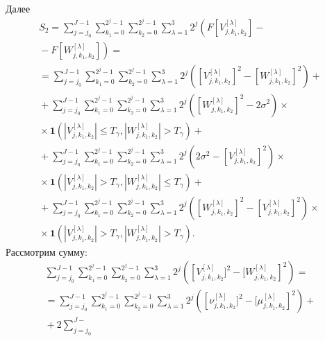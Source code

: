\begin{multicols}{2}
$$$$
Далее
\begin{multline}
\label{Sums}
S_2=\sum\limits_{j = j_0}^{J - 1}\sum\limits_{k_1=0}^{2^j-1}
\sum\limits_{k_2=0}^{2^j-1}\sum\limits_{\lambda=1}^3 
2^j\left(F\left[V_{j,k_1,k_2}^{[\lambda]}\right]-{}\right.\\
\left.{}-
F\left[W_{j,k_1,k_2}^{[\lambda]}\right]\right)={}\\
{}=\sum\limits_{j = j_0}^{J - 1}\sum\limits_{k_1=0}^{2^j-1}
\sum\limits_{k_2=0}^{2^j-1}\sum\limits_{\lambda=1}^3 
2^j\left(\left[V_{j,k_1,k_2}^{[\lambda]}\right]^2-
\left[W_{j,k_1,k_2}^{[\lambda]}\right]^2\right)+{}\\
{}+\sum\limits_{j = j_0}^{J - 1}\sum\limits_{k_1=0}^{2^j-1}
\sum\limits_{k_2=0}^{2^j-1}\sum\limits_{\lambda=1}^3 
2^j\left(\left[W_{j,k_1,k_2}^{[\lambda]}\right]^2-2\sigma^2\right)
\times{}\\ 
{}\times
\mathbf{1}\left(\left\vert V_{j,k_1,k_2}^{[\lambda]}\right\vert \leqslant T_\gamma, 
\left\vert W_{j,k_1,k_2}^{[\lambda]}\right\vert > T_\gamma\right)+{}\\
{}+\sum\limits_{j = j_0}^{J - 1}\sum\limits_{k_1=0}^{2^j-1}
\sum\limits_{k_2=0}^{2^j-1}\sum\limits_{\lambda=1}^3 
2^j\left(2\sigma^2-\left[V_{j,k_1,k_2}^{[\lambda]}\right]^2\right)
\times{}\\ {}\times
\mathbf{1}\left(\left\vert V_{j,k_1,k_2}^{[\lambda]}\right\vert > T_\gamma, 
\left\vert W_{j,k_1,k_2}^{[\lambda]}\right\vert \leqslant T_\gamma\right)+{}\\
{}+ \sum\limits_{j = j_0}^{J - 1}\sum\limits_{k_1=0}^{2^j-1}
\sum\limits_{k_2=0}^{2^j-1}\sum\limits_{\lambda=1}^3 
2^j\left(\left[W_{j,k_1,k_2}^{[\lambda]}\right]^2-
\left[V_{j,k_1,k_2}^{[\lambda]}\right]^2\right)
\times{}\\ {}\times
\mathbf{1}\left(\left\vert V_{j,k_1,k_2}^{[\lambda]}\right\vert > T_\gamma, 
\left\vert W_{j,k_1,k_2}^{[\lambda]}\right\vert > T_\gamma\right).
\end{multline}
Рассмотрим сумму: 
\begin{multline*}
\sum\limits_{j = j_0}^{J - 1}\sum\limits_{k_1=0}^{2^j-
1}\sum\limits_{k_2=0}^{2^j-1}\sum\limits_{\lambda=1}^3 
2^j\left(\left[V_{j,k_1,k_2}^{[\lambda]}]^2-[W_{j,k_1,k_2}^{[\lambda]}\right]^2\right)={}\\
{}=\sum\limits_{j = j_0}^{J - 1}\sum\limits_{k_1=0}^{2^j-1}
\sum\limits_{k_2=0}^{2^j-1}\sum\limits_{\lambda=1}^3 
2^j\left(\left[\nu_{j,k_1,k_2}^{[\lambda]}]^2-
[\mu_{j,k_1,k_2}^{[\lambda]}\right]^2\right)+{}\\
{}+2\sum\limits_{j = j_0}^{J - 
}
\end{multline*}
\end{multicols}
